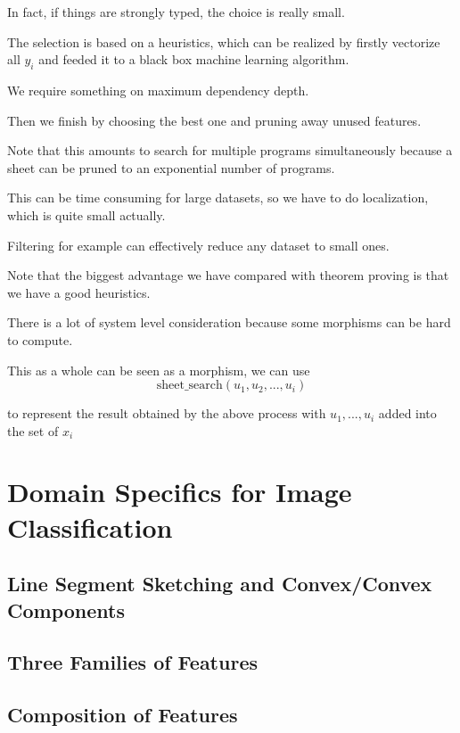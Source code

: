 \documentclass[11pt]{article} 	%
\theoremstyle{definition}
\begin{document}
In fact, if things are strongly typed, the choice is really small.

The selection is based on a heuristics, which can be realized by firstly vectorize all $y_i$ and feeded it to a black box machine learning algorithm.

We require something on maximum dependency depth.

Then we finish by choosing the best one and pruning away unused features.

Note that this amounts to search for multiple programs simultaneously because a sheet can be pruned to an exponential number of programs.

This can be time consuming for large datasets, so we have to do localization, which is quite small actually.

Filtering for example can effectively reduce any dataset to small ones.

Note that the biggest advantage we have compared with theorem proving is that we have a good heuristics.

There is a lot of system level consideration because some morphisms can be hard to compute.

This as a whole can be seen as a morphism, we can use
\begin{equation}
	\text{sheet\_search}(u_1,u_2,..., u_i)
\end{equation}

to represent the result obtained by the above process with $u_1,...,u_i$ added into the set of $x_i$

\section{Domain Specifics for Image Classification}

\subsection{Line Segment Sketching and Convex/Convex Components}

\subsection{Three Families of Features}

\subsection{Composition of Features}
\end{document}

